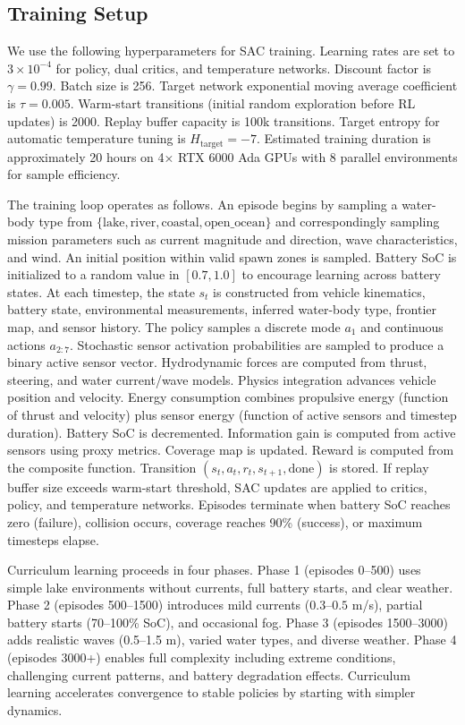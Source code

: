\subsection{Training Setup}

We use the following hyperparameters for SAC training. Learning rates are set to $3 \times 10^{-4}$ for policy, dual critics, and temperature networks. Discount factor is $\gamma = 0.99$. Batch size is 256. Target network exponential moving average coefficient is $\tau = 0.005$. Warm-start transitions (initial random exploration before RL updates) is 2000. Replay buffer capacity is 100k transitions. Target entropy for automatic temperature tuning is $H_{\text{target}} = -7$. Estimated training duration is approximately 20 hours on 4× RTX 6000 Ada GPUs with 8 parallel environments for sample efficiency.

The training loop operates as follows. An episode begins by sampling a water-body type from $\{\text{lake}, \text{river}, \text{coastal}, \text{open\_ocean}\}$ and correspondingly sampling mission parameters such as current magnitude and direction, wave characteristics, and wind. An initial position within valid spawn zones is sampled. Battery SoC is initialized to a random value in $[0.7, 1.0]$ to encourage learning across battery states. At each timestep, the state $s_t$ is constructed from vehicle kinematics, battery state, environmental measurements, inferred water-body type, frontier map, and sensor history. The policy samples a discrete mode $a_1$ and continuous actions $a_{2:7}$. Stochastic sensor activation probabilities are sampled to produce a binary active sensor vector. Hydrodynamic forces are computed from thrust, steering, and water current/wave models. Physics integration advances vehicle position and velocity. Energy consumption combines propulsive energy (function of thrust and velocity) plus sensor energy (function of active sensors and timestep duration). Battery SoC is decremented. Information gain is computed from active sensors using proxy metrics. Coverage map is updated. Reward is computed from the composite function. Transition $(s_t, a_t, r_t, s_{t+1}, \text{done})$ is stored. If replay buffer size exceeds warm-start threshold, SAC updates are applied to critics, policy, and temperature networks. Episodes terminate when battery SoC reaches zero (failure), collision occurs, coverage reaches 90\% (success), or maximum timesteps elapse.

Curriculum learning proceeds in four phases. Phase 1 (episodes 0--500) uses simple lake environments without currents, full battery starts, and clear weather. Phase 2 (episodes 500--1500) introduces mild currents ($0.3$--$0.5$ m/s), partial battery starts (70--100\% SoC), and occasional fog. Phase 3 (episodes 1500--3000) adds realistic waves (0.5--1.5 m), varied water types, and diverse weather. Phase 4 (episodes 3000+) enables full complexity including extreme conditions, challenging current patterns, and battery degradation effects. Curriculum learning accelerates convergence to stable policies by starting with simpler dynamics.

